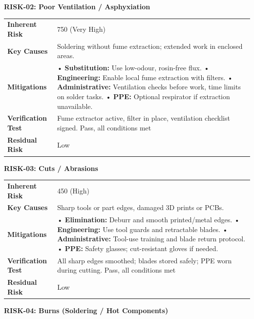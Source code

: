 \textbf{RISK-02: Poor Ventilation / Asphyxiation}

\begin{tabular}{@{}p{3cm}p{13cm}@{}}
\toprule
\textbf{Inherent Risk} & 750 (Very High) \\
\textbf{Key Causes} & Soldering without fume extraction; extended work in enclosed areas. \\
\textbf{Mitigations} &
• \textbf{Substitution:} Use low-odour, rosin-free flux. \newline
• \textbf{Engineering:} Enable local fume extraction with filters. \newline
• \textbf{Administrative:} Ventilation checks before work, time limits on solder tasks. \newline
• \textbf{PPE:} Optional respirator if extraction unavailable. \\
\textbf{Verification Test} & Fume extractor active, filter in place, ventilation checklist signed. Pass, all conditions met \\
\textbf{Residual Risk} & Low \\
\bottomrule
\end{tabular}
\vspace{0.6em}

\textbf{RISK-03: Cuts / Abrasions}

\begin{tabular}{@{}p{3cm}p{13cm}@{}}
\toprule
\textbf{Inherent Risk} & 450 (High) \\
\textbf{Key Causes} & Sharp tools or part edges, damaged 3D prints or PCBs. \\
\textbf{Mitigations} &
• \textbf{Elimination:} Deburr and smooth printed/metal edges. \newline
• \textbf{Engineering:} Use tool guards and retractable blades. \newline
• \textbf{Administrative:} Tool-use training and blade return protocol. \newline
• \textbf{PPE:} Safety glasses; cut-resistant gloves if needed. \\
\textbf{Verification Test} & All sharp edges smoothed; blades stored safely; PPE worn during cutting. Pass, all conditions met \\
\textbf{Residual Risk} & Low \\
\bottomrule
\end{tabular}
\vspace{0.6em}

\pagebreak
\textbf{RISK-04: Burns (Soldering / Hot Components)}

